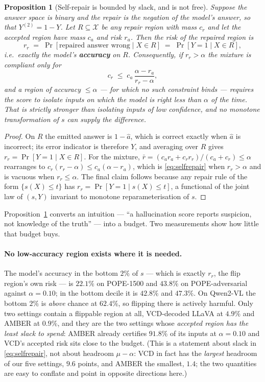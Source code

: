 \documentclass[review,number,doubleblind]{elsarticle}
\theoremstyle{plain}
\newtheorem{proposition}{Proposition}
\theoremstyle{definition}
\theoremstyle{remark}
\begin{document}
\begin{proposition}[Self-repair is bounded by slack, and is not free]
\label{prop:selfrepair}
Suppose the answer space is binary and the repair is the negation of the model's answer, so
that $Y^{(2)}=1-Y$. Let $R\subseteq\mathcal{X}$ be any repair region with mass $c_r$ and let
the accepted region have mass $c_a$ and risk $r_a$. Then the risk of the repaired region is
\[
  r_r \;=\; \Pr[\text{repaired answer wrong}\mid X\in R] \;=\; \Pr[Y=1\mid X\in R],
\]
i.e.\ exactly the model's \textbf{accuracy} on $R$. Consequently, if $r_r>\alpha$ the
mixture is compliant only for
\begin{equation}
\label{eq:selfrepair}
  c_r \;\le\; c_a\,\frac{\alpha-r_a}{r_r-\alpha},
\end{equation}
and a region of accuracy $\le\alpha$ --- for which no such constraint binds --- requires the
score to isolate inputs on which the model is right less than $\alpha$ of the time. That is
strictly stronger than isolating inputs of low \emph{confidence}, and no monotone
transformation of $s$ can supply the difference.
\end{proposition}

\begin{proof}
On $R$ the emitted answer is $1-\hat a$, which is correct exactly when $\hat a$ is
incorrect; its error indicator is therefore $Y$, and averaging over $R$ gives
$r_r=\Pr[Y=1\mid X\in R]$. For the mixture,
$\bar r=(c_ar_a+c_rr_r)/(c_a+c_r)\le\alpha$ rearranges to
$c_r(r_r-\alpha)\le c_a(\alpha-r_a)$, which is \eqref{eq:selfrepair} when $r_r>\alpha$ and
is vacuous when $r_r\le\alpha$. The final claim follows because any repair rule of the form
$\{s(X)\le t\}$ has $r_r=\Pr[Y=1\mid s(X)\le t]$, a functional of the joint law of $(s,Y)$
invariant to monotone reparameterisation of $s$.
\end{proof}

Proposition~\ref{prop:selfrepair} converts an intuition --- ``a hallucination score reports
suspicion, not knowledge of the truth'' --- into a budget. Two measurements show how little
that budget buys.

\paragraph{No low-accuracy region exists where it is needed.}
The model's accuracy in the bottom $2\%$ of $s$ --- which is exactly $r_r$, the flip region's
own risk --- is $22.1\%$ on POPE-1500 and $43.8\%$ on POPE-adversarial against $\alpha=0.10$;
in the bottom decile it is $42.8\%$ and $47.3\%$. On Qwen2-VL the bottom $2\%$ is \emph{above}
chance at $62.4\%$, so flipping there is actively harmful. Only two settings contain a flippable
region at all, VCD-decoded LLaVA at $4.9\%$ and AMBER at $0.9\%$, and they are the two settings
whose \emph{accepted region has the least slack to spend}: AMBER already certifies $91.8\%$ of
its inputs at $\alpha=0.10$ and VCD's accepted risk sits close to the budget. (This is a
statement about slack in \eqref{eq:selfrepair}, not about headroom $\mu-\alpha$: VCD in fact has
the \emph{largest} headroom of our five settings, $9.6$ points, and AMBER the smallest, $1.4$;
the two quantities are easy to conflate and point in opposite directions here.)
\end{document}
